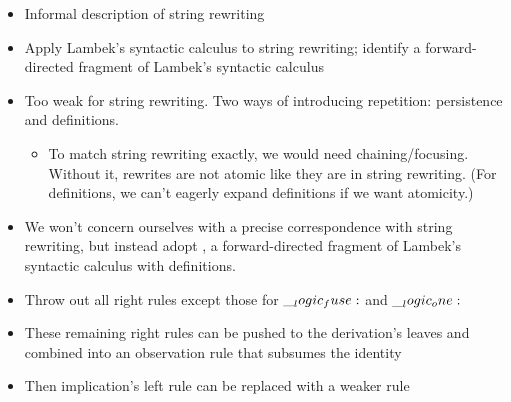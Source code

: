 \begin{itemize}
\item Informal description of string rewriting
\item Apply Lambek's syntactic calculus to string rewriting; identify a forward-directed fragment of Lambek's syntactic calculus
\item Too weak for string rewriting.  Two ways of introducing repetition: persistence and definitions.
  \begin{itemize}
  \item To match string rewriting exactly, we would need chaining/focusing.  Without it, rewrites are not atomic like they are in string rewriting.
    (For definitions, we can't eagerly expand definitions if we want atomicity.)
  \end{itemize}
\item We won't concern ourselves with a precise correspondence with string rewriting, but instead adopt , a forward-directed fragment of Lambek's syntactic calculus with definitions.
\end{itemize}


\clearpage

\begin{itemize}
\item Throw out all right rules except those for $\__logic_fuse:$ and $\__logic_one:$
\item These remaining right rules can be pushed to the derivation's leaves and combined into an observation rule that subsumes the identity
\item Then implication's left rule can be replaced with a weaker rule
\end{itemize}



